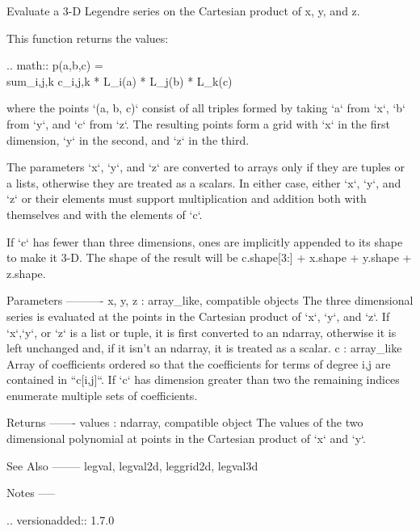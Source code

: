\begin{DoxyVerb}Evaluate a 3-D Legendre series on the Cartesian product of x, y, and z.

This function returns the values:

.. math:: p(a,b,c) = \\sum_{i,j,k} c_{i,j,k} * L_i(a) * L_j(b) * L_k(c)

where the points `(a, b, c)` consist of all triples formed by taking
`a` from `x`, `b` from `y`, and `c` from `z`. The resulting points form
a grid with `x` in the first dimension, `y` in the second, and `z` in
the third.

The parameters `x`, `y`, and `z` are converted to arrays only if they
are tuples or a lists, otherwise they are treated as a scalars. In
either case, either `x`, `y`, and `z` or their elements must support
multiplication and addition both with themselves and with the elements
of `c`.

If `c` has fewer than three dimensions, ones are implicitly appended to
its shape to make it 3-D. The shape of the result will be c.shape[3:] +
x.shape + y.shape + z.shape.

Parameters
----------
x, y, z : array_like, compatible objects
    The three dimensional series is evaluated at the points in the
    Cartesian product of `x`, `y`, and `z`.  If `x`,`y`, or `z` is a
    list or tuple, it is first converted to an ndarray, otherwise it is
    left unchanged and, if it isn't an ndarray, it is treated as a
    scalar.
c : array_like
    Array of coefficients ordered so that the coefficients for terms of
    degree i,j are contained in ``c[i,j]``. If `c` has dimension
    greater than two the remaining indices enumerate multiple sets of
    coefficients.

Returns
-------
values : ndarray, compatible object
    The values of the two dimensional polynomial at points in the Cartesian
    product of `x` and `y`.

See Also
--------
legval, legval2d, leggrid2d, legval3d

Notes
-----

.. versionadded:: 1.7.0\end{DoxyVerb}
 \mbox{\label{namespacenumpy_1_1polynomial_1_1legendre_a1468953b379717b49b193e84b4b99f13}} 
